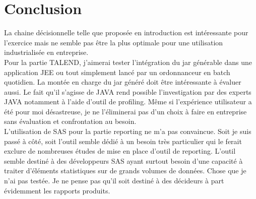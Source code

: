 \chapter{Conclusion}

La chaine décisionnelle telle que proposée en introduction est intéressante pour l'exercice mais ne semble pas être la plus optimale pour une utilisation industrialisée en entreprise. \\
Pour la partie TALEND, j'aimerai tester l'intégration du jar générable dans une application JEE ou tout simplement lancé par un ordonnanceur en batch quotidien. La montée en charge du jar généré doit être intéressante à évaluer aussi. Le fait qu'il s'agisse de JAVA rend possible l'investigation par des experts JAVA notamment à l'aide d'outil de profiling. Même si l'expérience utilisateur a été pour moi désastreuse, je ne l'éliminerai pas d'un choix à faire en entreprise sans évaluation et confrontation au besoin.\\
L'utilisation de SAS pour la partie reporting ne m'a pas convaincue. Soit je suis passé à côté, soit l'outil semble dédié à un besoin très particulier qui le ferait exclure de nombreuses études de mise en place d'outil de reporting. L'outil semble destiné à des développeurs SAS ayant surtout besoin d'une capacité à traiter d'éléments statistiques sur de grands volumes de données. Chose que je n'ai pas testée. Je ne pense pas qu'il soit destiné à des décideurs à part évidemment les rapports produits.
